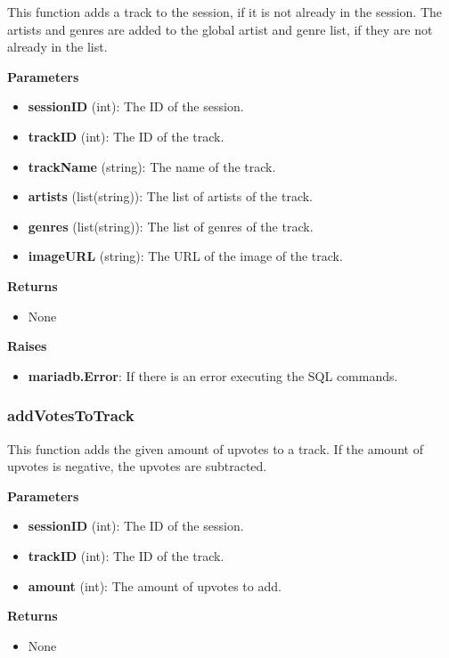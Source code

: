 \documentclass[oneside, ngerman]{sdqtechreport}
\begin{document}
This function adds a track to the session, if it is not already in the session. The artists and genres are added to the global artist and genre list, if they are not already in the list.

\textbf{Parameters}

\begin{itemize} \item \textbf{sessionID} (int): The ID of the session. \item \textbf{trackID} (int): The ID of the track. \item \textbf{trackName} (string): The name of the track. \item \textbf{artists} (list(string)): The list of artists of the track. \item \textbf{genres} (list(string)): The list of genres of the track. \item \textbf{imageURL} (string): The URL of the image of the track. \end{itemize}

\textbf{Returns}

\begin{itemize} \item None \end{itemize}

\textbf{Raises}

\begin{itemize} \item \textbf{mariadb.Error}: If there is an error executing the SQL commands. \end{itemize}

\subsubsection{addVotesToTrack}

This function adds the given amount of upvotes to a track. If the amount of upvotes is negative, the upvotes are subtracted.

\textbf{Parameters}

\begin{itemize} \item \textbf{sessionID} (int): The ID of the session. \item \textbf{trackID} (int): The ID of the track. \item \textbf{amount} (int): The amount of upvotes to add. \end{itemize}

\textbf{Returns}

\begin{itemize} \item None \end{itemize}
\end{document}
